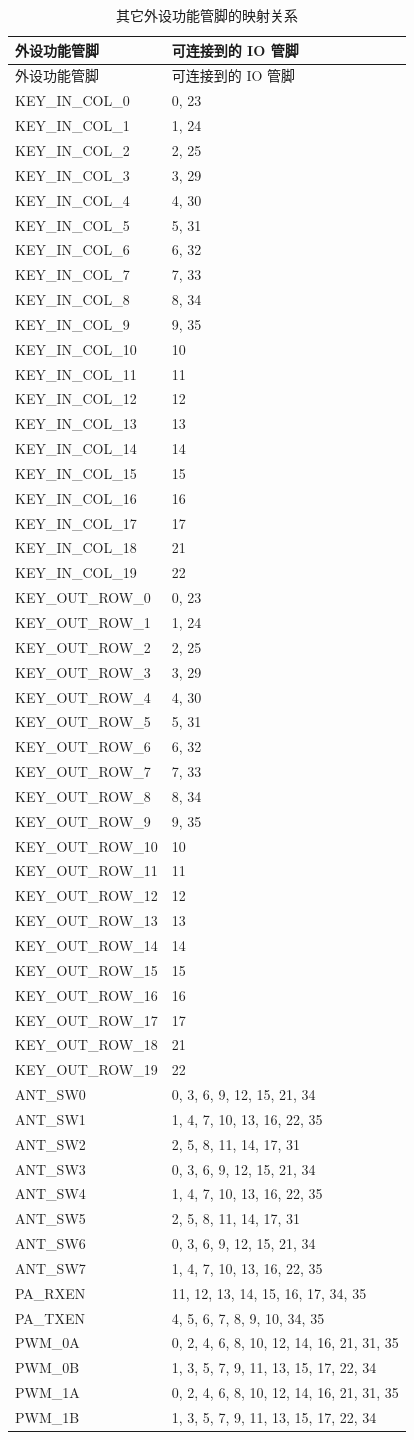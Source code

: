 \documentclass[
  12pt,
]{book}
\begin{document}
\begin{longtable}[]{@{}ll@{}}
\caption{\label{tab:ch-pinctrl-mapping} 其它外设功能管脚的映射关系}\tabularnewline
\toprule
外设功能管脚 & 可连接到的 IO 管脚\tabularnewline
\midrule
\endfirsthead
\toprule
外设功能管脚 & 可连接到的 IO 管脚\tabularnewline
\midrule
\endhead
KEY\_IN\_COL\_0 & 0, 23\tabularnewline
KEY\_IN\_COL\_1 & 1, 24\tabularnewline
KEY\_IN\_COL\_2 & 2, 25\tabularnewline
KEY\_IN\_COL\_3 & 3, 29\tabularnewline
KEY\_IN\_COL\_4 & 4, 30\tabularnewline
KEY\_IN\_COL\_5 & 5, 31\tabularnewline
KEY\_IN\_COL\_6 & 6, 32\tabularnewline
KEY\_IN\_COL\_7 & 7, 33\tabularnewline
KEY\_IN\_COL\_8 & 8, 34\tabularnewline
KEY\_IN\_COL\_9 & 9, 35\tabularnewline
KEY\_IN\_COL\_10 & 10\tabularnewline
KEY\_IN\_COL\_11 & 11\tabularnewline
KEY\_IN\_COL\_12 & 12\tabularnewline
KEY\_IN\_COL\_13 & 13\tabularnewline
KEY\_IN\_COL\_14 & 14\tabularnewline
KEY\_IN\_COL\_15 & 15\tabularnewline
KEY\_IN\_COL\_16 & 16\tabularnewline
KEY\_IN\_COL\_17 & 17\tabularnewline
KEY\_IN\_COL\_18 & 21\tabularnewline
KEY\_IN\_COL\_19 & 22\tabularnewline
KEY\_OUT\_ROW\_0 & 0, 23\tabularnewline
KEY\_OUT\_ROW\_1 & 1, 24\tabularnewline
KEY\_OUT\_ROW\_2 & 2, 25\tabularnewline
KEY\_OUT\_ROW\_3 & 3, 29\tabularnewline
KEY\_OUT\_ROW\_4 & 4, 30\tabularnewline
KEY\_OUT\_ROW\_5 & 5, 31\tabularnewline
KEY\_OUT\_ROW\_6 & 6, 32\tabularnewline
KEY\_OUT\_ROW\_7 & 7, 33\tabularnewline
KEY\_OUT\_ROW\_8 & 8, 34\tabularnewline
KEY\_OUT\_ROW\_9 & 9, 35\tabularnewline
KEY\_OUT\_ROW\_10 & 10\tabularnewline
KEY\_OUT\_ROW\_11 & 11\tabularnewline
KEY\_OUT\_ROW\_12 & 12\tabularnewline
KEY\_OUT\_ROW\_13 & 13\tabularnewline
KEY\_OUT\_ROW\_14 & 14\tabularnewline
KEY\_OUT\_ROW\_15 & 15\tabularnewline
KEY\_OUT\_ROW\_16 & 16\tabularnewline
KEY\_OUT\_ROW\_17 & 17\tabularnewline
KEY\_OUT\_ROW\_18 & 21\tabularnewline
KEY\_OUT\_ROW\_19 & 22\tabularnewline
ANT\_SW0 & 0, 3, 6, 9, 12, 15, 21, 34\tabularnewline
ANT\_SW1 & 1, 4, 7, 10, 13, 16, 22, 35\tabularnewline
ANT\_SW2 & 2, 5, 8, 11, 14, 17, 31\tabularnewline
ANT\_SW3 & 0, 3, 6, 9, 12, 15, 21, 34\tabularnewline
ANT\_SW4 & 1, 4, 7, 10, 13, 16, 22, 35\tabularnewline
ANT\_SW5 & 2, 5, 8, 11, 14, 17, 31\tabularnewline
ANT\_SW6 & 0, 3, 6, 9, 12, 15, 21, 34\tabularnewline
ANT\_SW7 & 1, 4, 7, 10, 13, 16, 22, 35\tabularnewline
PA\_RXEN & 11, 12, 13, 14, 15, 16, 17, 34, 35\tabularnewline
PA\_TXEN & 4, 5, 6, 7, 8, 9, 10, 34, 35\tabularnewline
PWM\_0A & 0, 2, 4, 6, 8, 10, 12, 14, 16, 21, 31, 35\tabularnewline
PWM\_0B & 1, 3, 5, 7, 9, 11, 13, 15, 17, 22, 34\tabularnewline
PWM\_1A & 0, 2, 4, 6, 8, 10, 12, 14, 16, 21, 31, 35\tabularnewline
PWM\_1B & 1, 3, 5, 7, 9, 11, 13, 15, 17, 22, 34\tabularnewline

\end{longtable}
\end{document}
